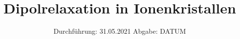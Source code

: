 

\subject{V 48}
\title{Dipolrelaxation in Ionenkristallen}
\date{%
  Durchführung: 31.05.2021
  \hspace{3em}
  Abgabe: DATUM
}



\maketitle
\thispagestyle{empty}
\tableofcontents
\newpage




%


\printbibliography{}


